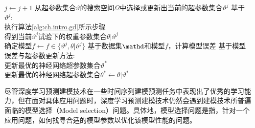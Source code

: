 \begin{algorithm}[t!]
    \caption{基于梯度下降方法的神经网络预测建模技术模型选择过程}
    \renewcommand{\algorithmcfname}{算法}
    \renewcommand{\algorithmicrequire}{\textbf{输入:}}
    \renewcommand{\algorithmicensure}{\textbf{输出:}}
    \label{alg:ch.intro.ms}
    \begin{algorithmic}[1]
        \STATE \(j\leftarrow j+1\)
        \STATE 从超参数集合\(\vartheta\)的搜索空间\(\Omega\)中选择或更新出当前的超参数集合\(\vartheta^j\)
        \STATE 基于\(\vartheta^j\):\\
        \hspace{2em}执行算法\ref{alg:ch.intro.gd}所示步骤\\
        \hspace{2em}得到当前\(\vartheta^j\)试验下的权重参数集合\(\theta|\vartheta^j\)\\
        \hspace{2em}确定模型\(f \leftarrow  f \in \{\vartheta^j, \theta|\vartheta^j\}\)
        \STATE 基于数据集\(\mathd\)和模型\(f\)，计算模型误差
        \STATE 基于模型误差与超参数更新方法:\\
        \hspace{2em}更新最优的神经网络超参数集合\(\vartheta^*\)\\
        \hspace{2em}更新最优的神经网络超参数集合\(\theta^* \leftarrow  \theta|\vartheta^*\)
        \ENDWHILE
    \end{algorithmic}
\end{algorithm}
尽管深度学习预测建模技术在一些时间序列建模预测任务中表现出了优秀的学习能力，但在面对具体应用问题时，深度学习预测建模技术仍然会遇到建模技术所普遍面临的模型选择（Model selection）问题。具体地，模型选择问题是指，针对一个应用问题，如何找寻合适的模型参数以优化该模型性能的问题\cite{guyonModel2010,hastieElements2009,escalanteParticle2009}。

